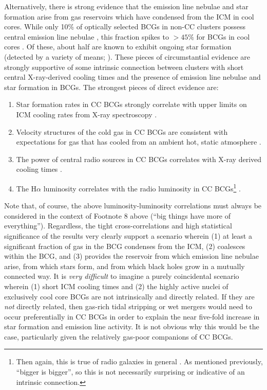 Alternatively, there is strong evidence that the emission line nebulae
and star formation arise from gas reservoirs which have condensed
from the ICM in cool cores.  While only 10\% of optically selected BCGs in
non-CC clusters possess central emission line nebulae
\citep{best06,edwards07}, this fraction spikes to  $>45\%$ for BCGs in cool
cores \citep{crawford99,edwards07}.  Of these, about half are known to exhibit
ongoing star formation (detected by a variety of means;
\citealt{johnstone87,mcnamara89,odea04,odea08,quillen08,odea10}).  
These pieces of circumstantial evidence are strongly supportive of 
some intrinsic connection between clusters with short central X-ray-derived cooling 
times and the presence of emission line nebulae and star formation in BCGs. 
The strongest pieces of direct evidence are: 
\begin{enumerate}

\item Star formation rates in CC BCGs strongly correlate with upper
limits on ICM cooling rates from X-ray spectroscopy \citep{mcnamara04,rafferty06,salome06,quillen08,odea08,odea10}.

\item Velocity structures of the cold gas in CC BCGs are consistent with expectations 
for gas that has cooled from an ambient hot, static atmosphere \citep{jaffe05,salome06}. 

\item The power of central radio sources in CC BCGs correlates with X-ray derived cooling times \citep{odeabaum87}.

\item The H$\alpha$ luminosity correlates with the radio luminosity in CC BCGs\footnote{Then again, this is true of radio galaxies in general \citep{baum88,baum89}. As mentioned previously, ``bigger is bigger'', so this is not necessarily surprising or indicative of an intrinsic connection.} \citep{heckman89}. 

\end{enumerate}

Note that, of course, the above luminosity-luminosity correlations must always be considered in 
the context of Footnote 8 above (``big things have more of everything''). Regardless, 
the tight cross-correlations and high statistical significance of the results very clearly 
support a scenario wherein (1) at least a significant fraction of gas in the BCG condenses from the ICM, 
(2) coalesces within the BCG, and (3) provides the reservoir from which emission line nebulae arise, from which 
stars form, and from which black holes grow in a mutually connected way. 
It is {\it very difficult} to imagine a purely coincidental scenario wherein (1) short ICM cooling times
and (2) the highly active nuclei of exclusively cool core BCGs are not intrinsically and directly related. 
If they are {\it not} directly related, then gas-rich tidal stripping or wet mergers would need to occur preferentially in CC BCGs in order 
to explain the near five-fold increase in star formation and emission line activity. It is not obvious 
why this would be the case, particularly given the relatively gas-poor companions of CC BCGs. 


